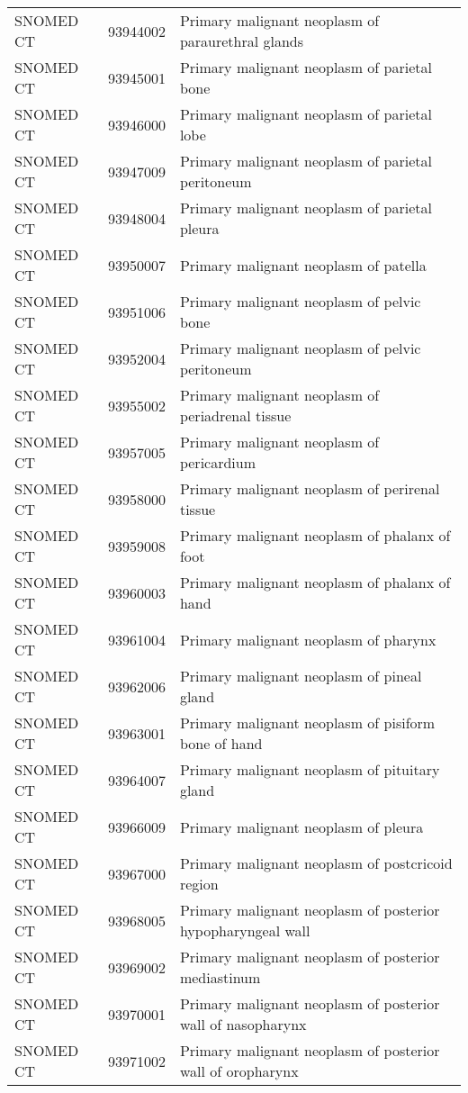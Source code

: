 \begin{longtable}{p{}p{}p{}}
  SNOMED CT & 93944002 & Primary malignant neoplasm of paraurethral glands \\ 
  SNOMED CT & 93945001 & Primary malignant neoplasm of parietal bone \\ 
  SNOMED CT & 93946000 & Primary malignant neoplasm of parietal lobe \\ 
  SNOMED CT & 93947009 & Primary malignant neoplasm of parietal peritoneum \\ 
  SNOMED CT & 93948004 & Primary malignant neoplasm of parietal pleura \\ 
  SNOMED CT & 93950007 & Primary malignant neoplasm of patella \\ 
  SNOMED CT & 93951006 & Primary malignant neoplasm of pelvic bone \\ 
  SNOMED CT & 93952004 & Primary malignant neoplasm of pelvic peritoneum \\ 
  SNOMED CT & 93955002 & Primary malignant neoplasm of periadrenal tissue \\ 
  SNOMED CT & 93957005 & Primary malignant neoplasm of pericardium \\ 
  SNOMED CT & 93958000 & Primary malignant neoplasm of perirenal tissue \\ 
  SNOMED CT & 93959008 & Primary malignant neoplasm of phalanx of foot \\ 
  SNOMED CT & 93960003 & Primary malignant neoplasm of phalanx of hand \\ 
  SNOMED CT & 93961004 & Primary malignant neoplasm of pharynx \\ 
  SNOMED CT & 93962006 & Primary malignant neoplasm of pineal gland \\ 
  SNOMED CT & 93963001 & Primary malignant neoplasm of pisiform bone of hand \\ 
  SNOMED CT & 93964007 & Primary malignant neoplasm of pituitary gland \\ 
  SNOMED CT & 93966009 & Primary malignant neoplasm of pleura \\ 
  SNOMED CT & 93967000 & Primary malignant neoplasm of postcricoid region \\ 
  SNOMED CT & 93968005 & Primary malignant neoplasm of posterior hypopharyngeal wall \\ 
  SNOMED CT & 93969002 & Primary malignant neoplasm of posterior mediastinum \\ 
  SNOMED CT & 93970001 & Primary malignant neoplasm of posterior wall of nasopharynx \\ 
  SNOMED CT & 93971002 & Primary malignant neoplasm of posterior wall of oropharynx \\ 

\end{longtable}
